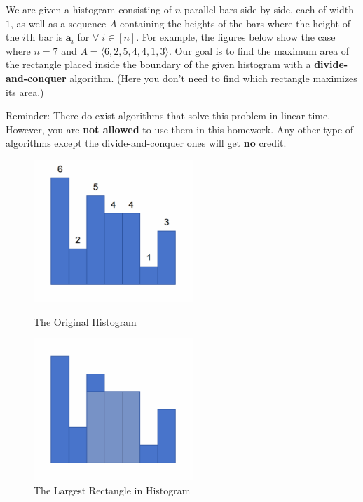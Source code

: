 
We are given a histogram consisting of $n$ parallel bars side by side, each of width $1$, as well as a sequence $A$ containing the heights of the bars where the height of the $i$th bar is $\mathbf{a}_i$ for $\forall \; i \in [n]$. For example, the figures below show the case where $n= 7$ and $A = \langle 6, 2, 5, 4, 4, 1, 3 \rangle$. Our goal is to find the maximum area of the rectangle placed inside the boundary of the given histogram with a \textbf{divide-and-conquer} algorithm. (Here you don't need to find which rectangle maximizes its area.)

Reminder: There do exist algorithms that solve this problem in linear time. However, you are \textbf{not allowed} to use them in this homework. Any other type of algorithms except the divide-and-conquer ones will get \textbf{no} credit.

\begin{figure}[htbp]
    \centering
    \begin{minipage}[t]{0.48\textwidth}
        \centering
        \includegraphics[width=6cm]{withnum.png}
        \caption{The Original Histogram}
    \end{minipage}
    \begin{minipage}[t]{0.48\textwidth}
        \centering
        \includegraphics[width=6cm]{withrect.png}
        \caption{The Largest Rectangle in Histogram}
    \end{minipage}
\end{figure}

